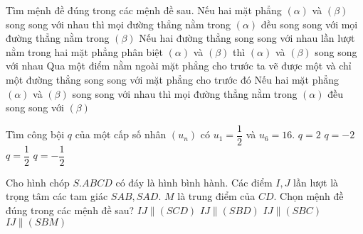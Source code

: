 \begin{ex}%
Tìm mệnh đề đúng trong các mệnh đề sau.
\choice
{Nếu hai mặt phẳng $(\alpha)$ và $(\beta)$ song song với nhau thì mọi đường thẳng nằm trong $(\alpha)$ đều song song với mọi đường thẳng nằm trong $(\beta)$}
{Nếu hai đường thẳng song song với nhau lần lượt nằm trong hai mặt phẳng phân biệt $(\alpha)$ và $(\beta)$ thì $(\alpha)$ và $(\beta)$ song song với nhau}
{Qua một điểm nằm ngoài mặt phẳng cho trước ta vẽ được một và chỉ một đường thẳng song song với mặt phẳng cho trước đó}
{\True  Nếu hai mặt phẳng $(\alpha)$ và $(\beta)$ song song với nhau thì mọi đường thẳng nằm trong $(\alpha)$ đều song song với $(\beta)$}
\loigiai{

}
\end{ex}

\begin{ex}%
Tìm công bội $q$ của một cấp số nhân $(u_n)$ có $u_1=\dfrac{1}{2}$ và $u_6 =16$.
\choice
{\True $q=2$}
{$q=-2$}
{$q=\dfrac{1}{2}$}
{$q=-\dfrac{1}{2}$}
\end{ex}

\begin{ex}%
Cho hình chóp $S.ABCD$ có đáy là hình bình hành. Các điểm $I,J$ lần lượt là trọng tâm các tam giác $SAB,SAD$. $M$ là trung điểm của $CD$. Chọn mệnh đề đúng trong các mệnh đề sau?
\choice
{$IJ \parallel (SCD)$}
{\True $IJ \parallel (SBD)$}
{$IJ \parallel (SBC)$}
{$IJ \parallel (SBM)$}
\end{ex}

